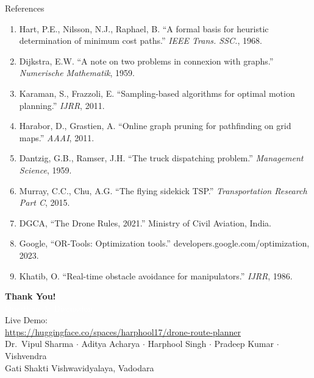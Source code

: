 \documentclass[aspectratio=169, 11pt]{beamer}
\begin{document}
\begin{frame}{References}
\footnotesize
\begin{enumerate}[leftmargin=*]
    \item Hart, P.E., Nilsson, N.J., Raphael, B. ``A formal basis for heuristic determination of minimum cost paths.'' \textit{IEEE Trans. SSC.}, 1968.
    \item Dijkstra, E.W. ``A note on two problems in connexion with graphs.'' \textit{Numerische Mathematik}, 1959.
    \item Karaman, S., Frazzoli, E. ``Sampling-based algorithms for optimal motion planning.'' \textit{IJRR}, 2011.
    \item Harabor, D., Grastien, A. ``Online graph pruning for pathfinding on grid maps.'' \textit{AAAI}, 2011.
    \item Dantzig, G.B., Ramser, J.H. ``The truck dispatching problem.'' \textit{Management Science}, 1959.
    \item Murray, C.C., Chu, A.G. ``The flying sidekick TSP.'' \textit{Transportation Research Part C}, 2015.
    \item DGCA, ``The Drone Rules, 2021.'' Ministry of Civil Aviation, India.
    \item Google, ``OR-Tools: Optimization tools.'' developers.google.com/optimization, 2023.
    \item Khatib, O. ``Real-time obstacle avoidance for manipulators.'' \textit{IJRR}, 1986.
\end{enumerate}
\end{frame}

\begin{frame}[plain]
\begin{center}
\vspace{2cm}
{\fontsize{36}{40}\selectfont\textcolor{neongreen}{\textbf{Thank You!}}}\\[0.8cm]
{\large\textcolor{white}{Questions \& Discussion}}\\[1.0cm]
{\small\textcolor{softgray}{Live Demo:}}\\[0.2cm]
{\small\textcolor{accentblue}{\url{https://huggingface.co/spaces/harphool17/drone-route-planner}}}\\[0.8cm]
{\footnotesize\textcolor{softgray}{Dr.\ Vipul Sharma $\cdot$ Aditya Acharya $\cdot$ Harphool Singh $\cdot$ Pradeep Kumar $\cdot$ Vishvendra}}\\[0.1cm]
{\footnotesize\textcolor{softgray}{Gati Shakti Vishwavidyalaya, Vadodara}}
\end{center}
\end{frame}
\end{document}
